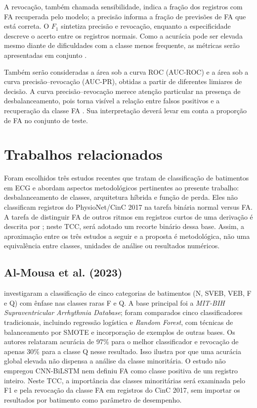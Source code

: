\documentclass[
    12pt,                %
    openright,           %
    oneside,             %
    a4paper,             %
    english,             %
    brazil               %
]{abntex2}
\begin{document}
A revocação, também chamada sensibilidade, indica a fração dos registros com FA recuperada pelo modelo; a precisão informa a fração de previsões de FA que está correta. O $F_1$ sintetiza precisão e revocação, enquanto a especificidade descreve o acerto entre os registros normais. Como a acurácia pode ser elevada mesmo diante de dificuldades com a classe menos frequente, as métricas serão apresentadas em conjunto \cite{Saito2015}.

Também serão consideradas a área sob a curva ROC (AUC-ROC) e a área sob a curva precisão--revocação (AUC-PR), obtidas a partir de diferentes limiares de decisão. A curva precisão--revocação merece atenção particular na presença de desbalanceamento, pois torna visível a relação entre falsos positivos e a recuperação da classe FA \cite{Saito2015}. Sua interpretação deverá levar em conta a proporção de FA no conjunto de teste.

\section{Trabalhos relacionados}
\label{sec:trabalhos_relacionados}

Foram escolhidos três estudos recentes que tratam de classificação de batimentos em ECG e abordam aspectos metodológicos pertinentes ao presente trabalho: desbalanceamento de classes, arquitetura híbrida e função de perda. Eles não classificam registros do PhysioNet/CinC 2017 na tarefa binária normal versus FA. A tarefa de distinguir FA de outros ritmos em registros curtos de uma derivação é descrita por ; neste TCC, será adotado um recorte binário dessa base. Assim, a aproximação entre os três estudos a seguir e a proposta é metodológica, não uma equivalência entre classes, unidades de análise ou resultados numéricos.

\subsection{Al-Mousa et al. (2023)}
\label{subsec:trab_almousa}

 investigaram a classificação de cinco categorias de batimentos (N, SVEB, VEB, F e Q) com ênfase nas classes raras F e Q. A base principal foi a \textit{MIT-BIH Supraventricular Arrhythmia Database}; foram comparados cinco classificadores tradicionais, incluindo regressão logística e \textit{Random Forest}, com técnicas de balanceamento por SMOTE e incorporação de exemplos de outras bases. Os autores relataram acurácia de 97\% para o melhor classificador e revocação de apenas 30\% para a classe Q nesse resultado. Isso ilustra por que uma acurácia global elevada não dispensa a análise da classe minoritária. O estudo não empregou CNN-BiLSTM nem definiu FA como classe positiva de um registro inteiro. Neste TCC, a importância das classes minoritárias será examinada pelo F1 e pela revocação da classe FA em registros do CinC 2017, sem importar os resultados por batimento como parâmetro de desempenho.
\end{document}
